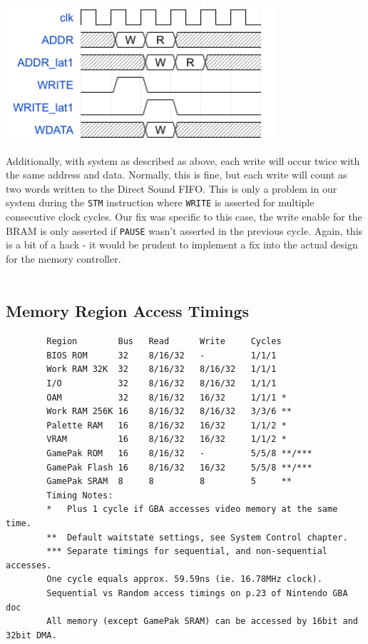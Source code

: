 \documentclass[11pt,a4paper]{article}
\begin{document}
		\includegraphics[height=5cm, keepaspectratio=true]{badaccess}


	Additionally, with system as described as above, each write will occur twice with the same address and data. Normally, this is fine, but each write will count as two words written to the Direct Sound FIFO. This is only a problem in our system during the \texttt{STM} instruction where \texttt{WRITE} is asserted for multiple consecutive clock cycles. Our fix was specific to this case, the write enable for the BRAM is only asserted if \texttt{PAUSE} wasn't asserted in the previous cycle. Again, this is a bit of a hack - it would be prudent to implement a fix into the actual design for the memory controller.\\\\

	\subsection{Memory Region Access Timings}
	\begin{verbatim}
	    Region        Bus   Read      Write     Cycles
	    BIOS ROM      32    8/16/32   -         1/1/1
	    Work RAM 32K  32    8/16/32   8/16/32   1/1/1
	    I/O           32    8/16/32   8/16/32   1/1/1
	    OAM           32    8/16/32   16/32     1/1/1 *
	    Work RAM 256K 16    8/16/32   8/16/32   3/3/6 **
	    Palette RAM   16    8/16/32   16/32     1/1/2 *
	    VRAM          16    8/16/32   16/32     1/1/2 *
	    GamePak ROM   16    8/16/32   -         5/5/8 **/***
	    GamePak Flash 16    8/16/32   16/32     5/5/8 **/***
	    GamePak SRAM  8     8         8         5     **
	    Timing Notes:
	    *   Plus 1 cycle if GBA accesses video memory at the same time.
	    **  Default waitstate settings, see System Control chapter.
	    *** Separate timings for sequential, and non-sequential accesses.
	    One cycle equals approx. 59.59ns (ie. 16.78MHz clock).
	    Sequential vs Random access timings on p.23 of Nintendo GBA doc
	    All memory (except GamePak SRAM) can be accessed by 16bit and 32bit DMA.
	    \end{verbatim} \cite{GBATek}
	
\end{document}
